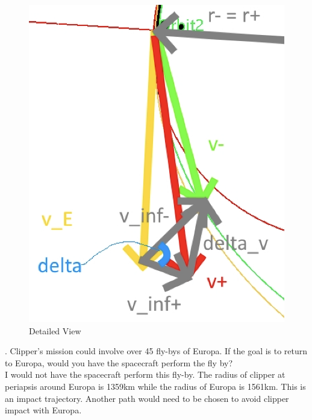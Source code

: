 \documentclass[hidelinks,12pt]{article}
\begin{document}
\begin{figure}[!htb]
  \center
  \includegraphics[scale=0.5]{detail}
  \caption{Detailed View}
  \label{fig:Fig2}
\end{figure}

\vspace{10px}
. Clipper's mission could involve over 45 fly-bys of Europa. If the goal is to return to Europa, would you have the spacecraft perform the fly by?\\
I would not have the spacecraft perform this fly-by. The radius of clipper at periapsis around Europa is 1359km while the radius of Europa is 1561km. This is an impact trajectory. Another path would need to be chosen to avoid clipper impact with Europa.
\newpage

\end{document}
